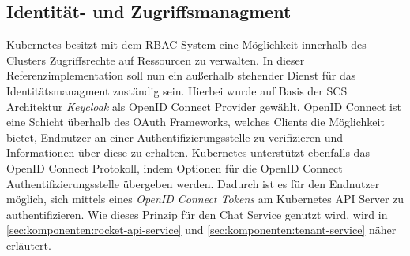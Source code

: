 \subsection{Identität- und Zugriffsmanagment}
Kubernetes besitzt mit dem \ac{RBAC} System eine Möglichkeit innerhalb des Clusters Zugriffsrechte auf Ressourcen
zu verwalten. In dieser Referenzimplementation soll nun ein außerhalb stehender Dienst für das Identitätsmanagment
zuständig sein. Hierbei wurde auf Basis der \ac{SCS} Architektur \emph{Keycloak} als OpenID Connect Provider gewählt.
OpenID Connect ist eine Schicht überhalb des OAuth Frameworks, welches Clients die Möglichkeit bietet, Endnutzer
an einer Authentifizierungsstelle zu verifizieren und Informationen über diese zu erhalten.\cite{OpenID2021}
Kubernetes unterstützt ebenfalls das OpenID Connect Protokoll, indem Optionen für die OpenID Connect Authentifizierungsstelle
übergeben werden. Dadurch ist es für den Endnutzer möglich, sich mittels eines \emph{OpenID Connect Tokens} am 
Kubernetes API Server zu authentifizieren. Wie dieses Prinzip für den Chat Service genutzt wird, wird 
in \ref{sec:komponenten:rocket-api-service} und \ref{sec:komponenten:tenant-service} näher erläutert.